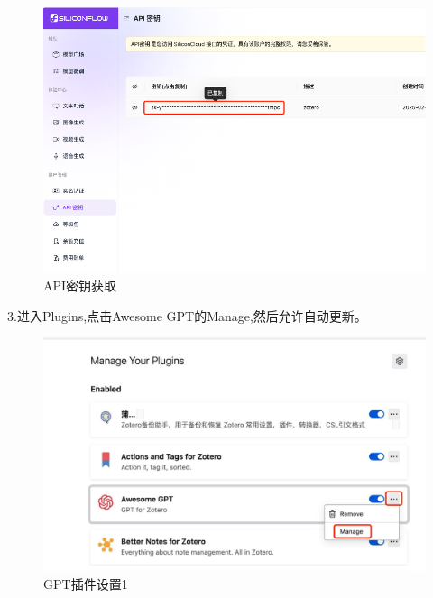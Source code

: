 \documentclass[]{ctexbook}
\theoremstyle{definition}
\theoremstyle{definition}
\theoremstyle{definition}
\theoremstyle{definition}
\theoremstyle{remark}
\begin{document}
\begin{figure}

{\centering \includegraphics[width=1\linewidth]{img/zotero/zotero_plugins_deepseek_2} 

}

\caption{API密钥获取}\label{fig:zotero-plugins-deepseek-2}
\end{figure}

3.进入Plugins,点击Awesome GPT的Manage,然后允许自动更新。

\begin{figure}

{\centering \includegraphics[width=1\linewidth]{img/zotero/zotero_plugins_deepseek_3} 

}

\caption{GPT插件设置1}\label{fig:zotero-plugins-deepseek-3}
\end{figure}
\end{document}
